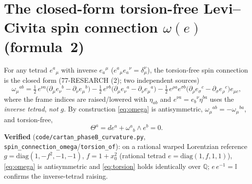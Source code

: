 \documentclass[11pt]{article}
\newcommand{\Q}{\mathbb{Q}}
\newcommand{\half}{\tfrac12}
\newcommand{\eu}{e}
\newcommand{\om}{\omega}
\theoremstyle{definition}\newtheorem{remark}{Remark}
\theoremstyle{plain}\newtheorem{proposition}{Proposition}
\begin{document}
\section{The closed-form torsion-free Levi--Civita spin connection $\om(e)$ (formula~2)}
For any tetrad $\eu^a{}_\mu$ with inverse $\eu_a{}^\mu$ ($\eu^a{}_\mu \eu_a{}^\nu=\delta_\mu^\nu$),
the torsion-free spin connection is the closed form (77-RESEARCH (2); two independent sources)
\begin{equation}\label{eq:omega}
  \om_\mu{}^{ab}
  = \half\,\eu^{\nu a}\bigl(\partial_\mu \eu_\nu{}^b-\partial_\nu \eu_\mu{}^b\bigr)
  - \half\,\eu^{\nu b}\bigl(\partial_\mu \eu_\nu{}^a-\partial_\nu \eu_\mu{}^a\bigr)
  - \half\,\eu^{\rho a}\eu^{\sigma b}\bigl(\partial_\rho \eu_\sigma{}^c-\partial_\sigma \eu_\rho{}^c\bigr)\eu_{\mu c},
\end{equation}
where the frame indices are raised/lowered with $\eta_{ab}$ and $\eu^{\nu a}=\eu_b{}^\nu\eta^{ba}$
uses the \emph{inverse tetrad}, \emph{not} $g$. By construction \eqref{eq:omega} is
antisymmetric, $\om_\mu{}^{ab}=-\om_\mu{}^{ba}$, and torsion-free,
\begin{equation}\label{eq:torsion}
  \Theta^a=d\eu^a+\om^a{}_b\wedge \eu^b=0 .
\end{equation}
\textbf{Verified} (\texttt{code/cartan\_phaseB\_curvature.py}, \texttt{spin\_connection\_omega}/\texttt{torsion\_of}):
on a rational warped Lorentzian reference $g=\mathrm{diag}(1,-f^2,-1,-1)$, $f=1+x_0^2$
(rational tetrad $\eu=\mathrm{diag}(1,f,1,1)$), \eqref{eq:omega} is antisymmetric and \eqref{eq:torsion}
holds identically over $\Q$; $\eu\,\eu^{-1}=\mathbb{I}$ confirms the inverse-tetrad raising.
\end{document}
